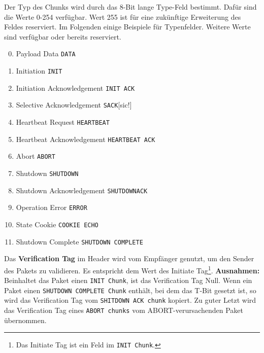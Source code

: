 \documentclass{article} %
\begin{document}
Der Typ des Chunks wird durch das 8-Bit lange Type-Feld bestimmt.
Dafür sind die Werte 0-254 verfügbar.
Wert 255 ist für eine zukünftige Erweiterung des Feldes reserviert.
Im Folgenden einige Beispiele für Typenfelder.
Weitere Werte sind verfügbar oder bereits reserviert.
\begin{multicols}{2}
	\begin{enumerate}
		\setcounter{enumi}{-1}
		\item Payload Data \texttt{DATA}
		\item Initiation \texttt{INIT}
		\item Initiation Acknowledgement \texttt{INIT ACK}
		\item Selective Acknowledgement \texttt{SACK}[sic!]
		\item Heartbeat Request \texttt{HEARTBEAT}
		\item Heartbeat Acknowledgement \texttt{HEARTBEAT ACK}
		\item Abort \texttt{ABORT}
		\item Shutdown \texttt{SHUTDOWN}
		\item Shutdown Acknowledgement \texttt{SHUTDOWNACK}
		\item Operation Error \texttt{ERROR}
		\item State Cookie \texttt{COOKIE ECHO}
		\setcounter{enumi}{13}
		\item Shutdown Complete \texttt{SHUTDOWN COMPLETE}
	\end{enumerate}
\end{multicols}


Das \textbf{Verification Tag} im Header wird vom Empfänger genutzt, um den Sender des Pakets zu validieren.
Es entspricht dem Wert des Initiate Tag\footnote{Das Initiate Tag ist ein Feld im \texttt{INIT Chunk}.}.
\textbf{Ausnahmen:} Beinhaltet das Paket einen \texttt{INIT Chunk}, ist das Verification Tag Null.
Wenn ein Paket einen \texttt{SHUTDOWN COMPLETE Chunk} enthält, bei dem das T-Bit gesetzt ist, so wird das Verification Tag vom \texttt{SHITDOWN ACK chunk} kopiert.
Zu guter Letzt wird das Verification Tag eines \texttt{ABORT chunks} vom ABORT-verursachenden Paket übernommen.
\end{document}
